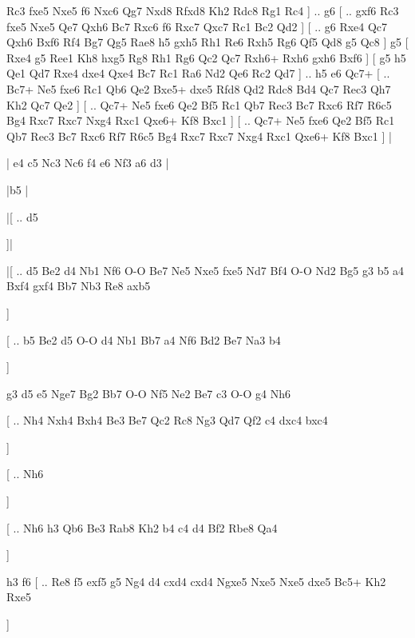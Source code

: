 Rc3 fxe5  Nxe5 f6  Nxc6 Qg7  Nxd8 Rfxd8  Kh2 Rdc8  Rg1 Rc4   ] .. g6 [ .. gxf6  Rc3 fxe5  Nxe5 Qe7  Qxh6 Bc7  Rxc6 f6  Rxc7 Qxc7  Rc1 Bc2  Qd2   ]  [ .. g6  Rxe4 Qc7  Qxh6 Bxf6  Rf4 Bg7  Qg5 Rae8  h5 gxh5  Rh1 Re6  Rxh5 Rg6  Qf5 Qd8  g5 Qc8   ]  g5 [  Rxe4 g5  Ree1 Kh8  hxg5 Rg8  Rh1 Rg6  Qc2 Qc7  Rxh6+ Rxh6  gxh6 Bxf6   ]  [  g5 h5  Qe1 Qd7  Rxe4 dxe4  Qxe4 Bc7  Rc1 Ra6  Nd2 Qe6  Rc2 Qd7   ] .. h5    e6   Qc7+ [ .. Bc7+  Ne5 fxe6  Rc1 Qb6  Qe2 Bxe5+  dxe5 Rfd8  Qd2 Rdc8  Bd4 Qc7  Rec3 Qh7  Kh2 Qc7  Qe2   ]  [ .. Qc7+  Ne5 fxe6  Qe2 Bf5  Rc1 Qb7  Rec3 Bc7  Rxc6 Rf7  R6c5 Bg4  Rxc7 Rxc7  Nxg4 Rxc1  Qxe6+ Kf8  Bxc1   ]  [ .. Qc7+  Ne5 fxe6  Qe2 Bf5  Rc1 Qb7  Rec3 Bc7  Rxc6 Rf7  R6c5 Bg4  Rxc7 Rxc7  Nxg4 Rxc1  Qxe6+ Kf8  Bxc1   ] |


\makegametitle

| e4   c5    Nc3   Nc6    f4   e6    Nf3   a6   d3 |

 \showboard 
 
 |b5 |
 
 \showboard 
 
|[ .. d5 

 \dummy \showboard
]|


|[ .. d5 Be2 d4  Nb1 Nf6  O-O Be7  Ne5 Nxe5  fxe5 Nd7  Bf4 O-O  Nd2 Bg5  g3 b5  a4 Bxf4  gxf4 Bb7  Nb3 Re8  axb5  

 \dummy \showboard ] 

  [ .. b5  Be2 d5  O-O d4  Nb1 Bb7  a4 Nf6  Bd2 Be7  Na3 b4  

 \dummy \showboard ] 
 
  g3   d5    e5   Nge7    Bg2   Bb7    O-O   Nf5    Ne2   Be7    c3   O-O    g4   Nh6 
  
  
  [ .. Nh4 Nxh4 Bxh4  Be3 Be7  Qc2 Rc8  Ng3 Qd7  Qf2 c4  dxc4 bxc4   
  
  \dummy \showboard]  
  
  [ .. Nh6  
  
  \dummy \showboard]
  
   [ .. Nh6 h3 Qb6  Be3 Rab8  Kh2 b4  c4 d4  Bf2 Rbe8  Qa4   \dummy 
   
   \showboard ]  
   
   h3   f6 [ .. Re8  f5 exf5  g5 Ng4  d4 cxd4  cxd4 Ngxe5  Nxe5 Nxe5  dxe5 Bc5+  Kh2 Rxe5   
   
   \dummy \showboard ]  
   
